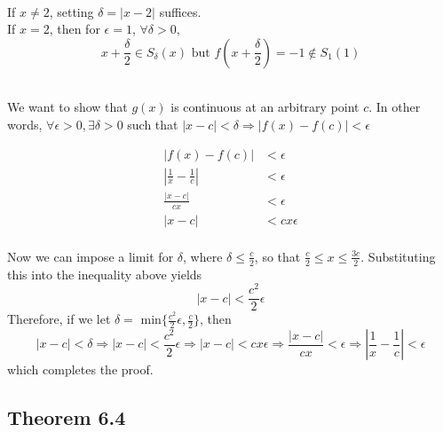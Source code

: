 \begin{solution}
 \\If $x\neq2$, setting $\delta = |x-2|$ suffices. \\
 If $x=2$, then for $\epsilon = 1$, $\forall \delta > 0$,
 $$x + \frac{\delta}{2} \in S_\delta(x) \text{ but } f\left(x + \frac{\delta}{2}\right) = -1 \notin S_1(1)$$
\end{solution}


\begin{solution}
 \\We want to show that $g(x)$ is continuous at an arbitrary point $c$. In other words, $\forall \epsilon > 0, \exists \delta > 0$ such that $|x-c| < \delta \Rightarrow |f(x)-f(c)| < \epsilon$
 
\begin{align*}
 |f(x)-f(c)| &< \epsilon \\
 \left|\frac{1}{x} - \frac{1}{c}\right| &< \epsilon \\
 \frac{|x-c|}{cx} &< \epsilon \\
 |x-c| &< cx\epsilon \\
\end{align*}

Now we can impose a limit for $\delta$, where $\delta \leq \frac{c}{2}$, so that $\frac{c}{2} \leq x \leq \frac{3c}{2}$. Substituting this into the inequality above yields
$$|x-c| < \frac{c^2}{2} \epsilon$$
Therefore, if we let $\delta =$ min$\{\frac{c^2}{2}\epsilon,\frac{c}{2}\}$, then
$$|x-c| < \delta \Rightarrow |x-c| < \frac{c^2}{2} \epsilon \Rightarrow |x-c| < cx\epsilon \Rightarrow \frac{|x-c|}{cx} < \epsilon \Rightarrow \left|\frac{1}{x} - \frac{1}{c}\right| < \epsilon$$
which completes the proof.
\end{solution}

\subsection{Theorem 6.4} \label{thm3.6.4}
\setcounter{question}{0}


